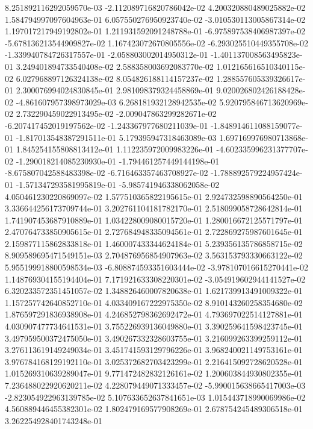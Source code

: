 8.251892116292059570e-03
-2.112089716820786042e-02
4.200320880489025882e-02
1.584794997097604963e-01
6.057550276950923740e-02
-3.010530113005867314e-02
1.197017217949192802e-01
1.211931592091248788e-01
-6.975897538406987397e-02
-5.678136213544909827e-02
1.167423072670805556e-02
-6.293025510449355708e-02
-1.339940784726317557e-01
-2.058803002014950312e-01
-1.401137008563495823e-01
3.249401894733540408e-02
2.588358003692083770e-02
1.012165616510340115e-02
6.027968897126324138e-02
8.054826188114157237e-02
1.288557605339326617e-01
2.300076994024830845e-01
2.981098379324458869e-01
9.020026802426188428e-02
-4.861607957398973029e-03
6.268181932128942535e-02
5.920795846713620969e-02
2.732290459022913495e-02
-2.009047863299282671e-02
-6.207417452019197562e-02
-1.243367977680211039e-01
-1.848914611088159077e-01
-1.817013548387291511e-01
5.179395947318463089e-03
1.697169976980713868e-01
1.845254155808813412e-01
1.112235972009983226e-01
-4.602335996231377707e-02
-1.290018214085230930e-01
-1.794461257449144198e-01
-8.675807042588483398e-02
-6.716463357463708927e-02
-1.788892579224957424e-01
-1.571347293581995819e-01
-5.985741946338062058e-02
4.050461230220869097e-02
1.577510365822195615e-01
2.924732598890564250e-01
3.336644256173709744e-01
3.202761104181782170e-01
2.518099058728642814e-01
1.741907453687910889e-01
1.034228009080015720e-01
1.280016672125571797e-01
2.470764733850905615e-01
2.727684948335094561e-01
2.722869275987601645e-01
2.159877115862833818e-01
1.460007433344624184e-01
5.239356135786858715e-02
8.909589695471549151e-03
2.704876956854907963e-02
3.563153793330663122e-02
5.955199918800598534e-03
-6.808874593351603444e-02
-3.978107016615270441e-02
1.148769304155194404e-01
7.171921633308220301e-02
-3.054919602944141527e-02
6.320233572351451057e-02
1.348826460007820638e-01
1.621739913491009322e-01
1.157257742640852710e-01
4.033409167222975350e-02
8.910143260258354680e-02
1.876597291836938908e-01
4.246852798362692472e-01
4.793697022514127881e-01
4.030907477734641531e-01
3.755226939136049880e-01
3.390259641598423745e-01
3.497959500372475050e-01
3.490267332328603755e-01
3.216099263399259112e-01
3.276113619149249034e-01
3.451741593129796226e-01
3.968240021149753161e-01
3.976784168129192110e-01
3.025372682703423299e-01
2.216415092728620528e-01
1.015269310639289047e-01
9.771472482832126161e-02
1.200603844930802355e-01
7.236488022920620211e-02
4.228079449071333457e-02
-5.990015638665417003e-03
-2.823054922963139785e-02
5.107633652637841651e-03
1.015443718990069986e-02
4.560889446455382301e-02
1.802479169577908269e-01
2.678754245489306518e-01
3.262254928401743248e-01
